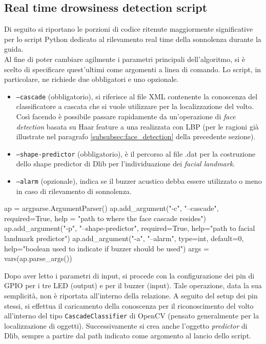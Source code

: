 \documentclass[12pt]{article}
\begin{document}
\subsection{Real time drowsiness detection script}
\label{subsec:main_script}
Di seguito si riportano le porzioni di codice ritenute maggiormente significative per lo script Python dedicato al rilevamento real time della sonnolenza durante la guida.\\
Al fine di poter cambiare agilmente i parametri principali dell'algoritmo, si è scelto di specificare quest'ultimi come argomenti a linea di comando. Lo script, in particolare, ne richiede due obbligatori e uno opzionale.
\begin{itemize}
	\item \texttt{--cascade} (obbligatorio), si riferisce al file XML contenente la conoscenza del classificatore a cascata che si vuole utilizzare per la localizzazione del volto. Così facendo è possibile passare rapidamente da un'operazione di \textit{face detection} basata su Haar feature a una realizzata con LBP (per le ragioni già illustrate nel paragrafo \ref{subsubsec:face_detection} della precedente sezione).
	\item \texttt{--shape-predictor} (obbligatorio), è il percorso al file .dat per la costruzione dello shape predictor di Dlib per l'individuazione dei \textit{facial landmark}.
	\item \texttt{--alarm} (opzionale), indica se il buzzer acustico debba essere utilizzato o meno in caso di rilevamento di sonnolenza.
\end{itemize}

\begin{python}
	ap = argparse.ArgumentParser()
	ap.add_argument("-c", "--cascade", required=True,
		help = "path to where the face cascade resides")
	ap.add_argument("-p", "--shape-predictor", required=True,
		help="path to facial landmark predictor")
	ap.add_argument("-a", "--alarm", type=int, default=0,
		help="boolean used to indicate if buzzer should be used")
	args = vars(ap.parse_args())
\end{python}

\vspace{0.3cm}
Dopo aver letto i parametri di input, si procede con la configurazione dei pin di GPIO per i tre LED (output) e per il buzzer (input). Tale operazione, data la sua semplicità, non è riportata all'interno della relazione. A seguito del setup dei pin stessi, si effettua il caricamento della conoscenza per il riconoscimento del volto all'interno del tipo \texttt{CascadeClassifier} di OpenCV (pensato generalmente per la localizzazione di oggetti)\cite{OpenCVCascadeClassifier}. Successivamente si crea anche l'oggetto \textit{predictor} di Dlib, sempre a partire dal path indicato come argomento al lancio dello script.
\vspace{0.3cm}
\end{document}
